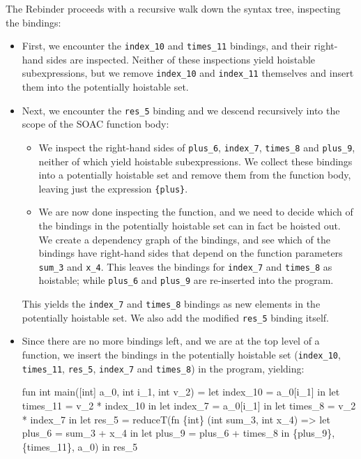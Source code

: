 The Rebinder proceeds with a recursive walk down the syntax tree,
inspecting the bindings:

\begin{itemize}
\item First, we encounter the \texttt{index\_10} and
  \texttt{times\_11} bindings, and their right-hand sides are
  inspected.  Neither of these inspections yield hoistable
  subexpressions, but we remove \texttt{index\_10} and
  \texttt{index\_11} themselves and insert them into the potentially
  hoistable set.

\item Next, we encounter the \texttt{res\_5} binding and we descend
  recursively into the scope of the SOAC function body:

  \begin{itemize}
  \item We inspect the right-hand sides of \texttt{plus\_6},
    \texttt{index\_7}, \texttt{times\_8} and \texttt{plus\_9}, neither
    of which yield hoistable subexpressions.  We collect these
    bindings into a potentially hoistable set and remove them from the
    function body, leaving just the expression \texttt{\{plus\}}.

  \item We are now done inspecting the function, and we need to decide
    which of the bindings in the potentially hoistable set can in fact
    be hoisted out.  We create a dependency graph of the bindings, and
    see which of the bindings have right-hand sides that depend on the
    function parameters \texttt{sum\_3} and \texttt{x\_4}.  This
    leaves the bindings for \texttt{index\_7} and \texttt{times\_8} as
    hoistable; while \texttt{plus\_6} and \texttt{plus\_9} are
    re-inserted into the program.
  \end{itemize}

  This yields the \texttt{index\_7} and \texttt{times\_8} bindings as
  new elements in the potentially hoistable set.  We also add the
  modified \texttt{res\_5} binding itself.

\item Since there are no more bindings left, and we are at the top
  level of a function, we insert the bindings in the potentially
  hoistable set (\texttt{index\_10}, \texttt{times\_11},
  \texttt{res\_5}, \texttt{index\_7} and \texttt{times\_8}) in the
  program, yielding:

\begin{colorcode}
fun int main([int] a_0, int i_1, int v_2) =
  let index_10 = a_0[i_1] in
  let times_11 = v_2 * index_10 in
  let index_7 = a_0[i_1] in
  let times_8 = v_2 * index_7 in
  let {res_5} =
    reduceT(fn \{int\} (int sum_3, int x_4) =>
              let plus_6 = sum_3 + x_4 in
              let plus_9 = plus_6 + times_8 in
              \{plus_9\},
            \{times_11\}, a_0) in
  res_5
\end{colorcode}
\end{itemize}

